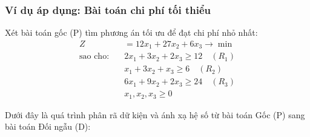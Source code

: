 \subsubsection*{Ví dụ áp dụng: Bài toán chi phí tối thiểu}
Xét bài toán gốc (P) tìm phương án tối ưu để đạt chi phí nhỏ nhất:
\begin{align*}
    Z &= 12x_1 + 27x_2 + 6x_3 \rightarrow \min \\
\text{sao cho:} \quad
    &2x_1 + 3x_2 + 2x_3 \ge 12 \quad (R_1)\\
    &x_1 + 3x_2 + x_3 \ge 6 \quad (R_2)\\
    &6x_1 + 9x_2 + 2x_3 \ge 24 \quad (R_3)\\
    &x_1, x_2, x_3 \ge 0
\end{align*}

Dưới đây là quá trình phân rã dữ kiện và ánh xạ hệ số từ bài toán Gốc (P) sang bài toán Đối ngẫu (D):

